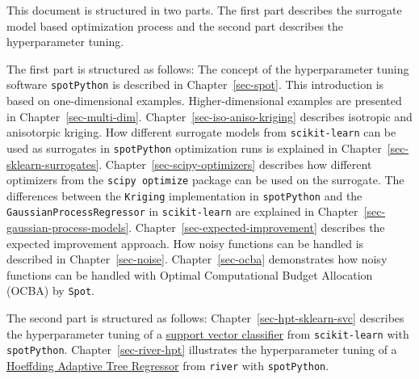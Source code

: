 \documentclass[
  letterpaper,
  DIV=11,
  numbers=noendperiod]{scrreprt}
\begin{document}

This document is structured in two parts. The first part describes the
surrogate model based optimization process and the second part describes
the hyperparameter tuning.

The first part is structured as follows: The concept of the
hyperparameter tuning software \texttt{spotPython} is described in
Chapter~\ref{sec-spot}. This introduction is based on one-dimensional
examples. Higher-dimensional examples are presented in
Chapter~\ref{sec-multi-dim}. Chapter~\ref{sec-iso-aniso-kriging}
describes isotropic and anisotorpic kriging. How different surrogate
models from \texttt{scikit-learn} can be used as surrogates in
\texttt{spotPython} optimization runs is explained in
Chapter~\ref{sec-sklearn-surrogates}. Chapter~\ref{sec-scipy-optimizers}
describes how different optimizers from the \texttt{scipy\ optimize}
package can be used on the surrogate. The differences between the
\texttt{Kriging} implementation in \texttt{spotPython} and the
\texttt{GaussianProcessRegressor} in \texttt{scikit-learn} are explained
in Chapter~\ref{sec-gaussian-process-models}.
Chapter~\ref{sec-expected-improvement} describes the expected
improvement approach. How noisy functions can be handled is described in
Chapter~\ref{sec-noise}. Chapter~\ref{sec-ocba} demonstrates how noisy
functions can be handled with Optimal Computational Budget Allocation
(OCBA) by \texttt{Spot}.

The second part is structured as follows:
Chapter~\ref{sec-hpt-sklearn-svc} describes the hyperparameter tuning of
a
\href{https://scikit-learn.org/stable/modules/generated/sklearn.svm.SVC.html\#sklearn.svm.SVCriver\%20python}{support
vector classifier} from \texttt{scikit-learn} with \texttt{spotPython}.
Chapter~\ref{sec-river-hpt} illustrates the hyperparameter tuning of a
\href{https://riverml.xyz/0.18.0/api/tree/HoeffdingAdaptiveTreeRegressor/}{Hoeffding
Adaptive Tree Regressor} from \texttt{river} with \texttt{spotPython}.
\end{document}
